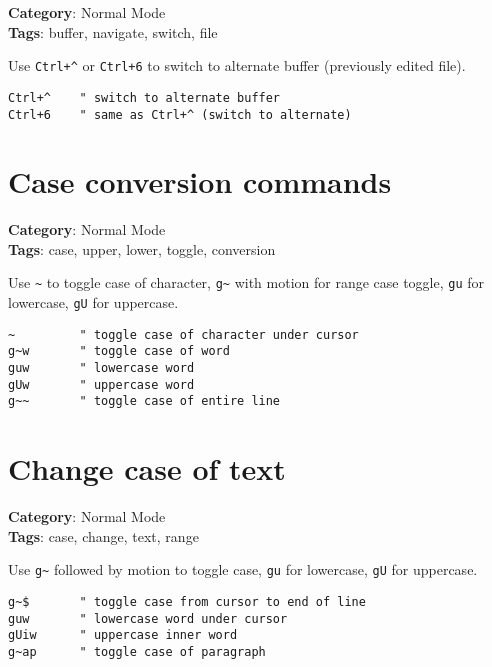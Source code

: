 {{{{{{{{{{\textbf{Category}: Normal Mode\\ \textbf{Tags}: buffer, navigate, switch, file
\vspace{0.5cm}

Use {\footnotesize \Verb§Ctrl+^§} or {\footnotesize \Verb§Ctrl+6§} to switch to alternate buffer (previously edited file).

\begin{Exa*}{}
\begin{Verbatim}[fontsize=\footnotesize, breaklines, breakanywhere]
Ctrl+^    " switch to alternate buffer
Ctrl+6    " same as Ctrl+^ (switch to alternate)
\end{Verbatim}
\end{Exa*}

\section{Case conversion commands}

\textbf{Category}: Normal Mode\\ \textbf{Tags}: case, upper, lower, toggle, conversion
\vspace{0.5cm}

Use {\footnotesize \Verb§~§} to toggle case of character, {\footnotesize \Verb§g~§} with motion for range case toggle, {\footnotesize \Verb§gu§} for lowercase, {\footnotesize \Verb§gU§} for uppercase.

\begin{Exa*}{}
\begin{Verbatim}[fontsize=\footnotesize, breaklines, breakanywhere]
~         " toggle case of character under cursor
g~w       " toggle case of word
guw       " lowercase word
gUw       " uppercase word
g~~       " toggle case of entire line
\end{Verbatim}
\end{Exa*}

\section{Change case of text}

\textbf{Category}: Normal Mode\\ \textbf{Tags}: case, change, text, range
\vspace{0.5cm}

Use {\footnotesize \Verb§g~§} followed by motion to toggle case, {\footnotesize \Verb§gu§} for lowercase, {\footnotesize \Verb§gU§} for uppercase.

\begin{Exa*}{}
\begin{Verbatim}[fontsize=\footnotesize, breaklines, breakanywhere]
g~$       " toggle case from cursor to end of line
guw       " lowercase word under cursor
gUiw      " uppercase inner word
g~ap      " toggle case of paragraph
\end{Verbatim}
\end{Exa*}

}}}}}}}}}}
